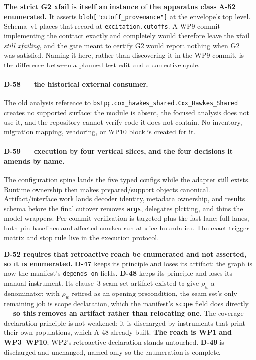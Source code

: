 \documentclass[
  10pt,
]{article}
\begin{document}
\textbf{The strict G2 xfail is itself an instance of the apparatus class A-52
enumerated.} It asserts \texttt{blob["cutoff\_provenance"]} at the envelope's
top level. Schema~v1 places that record at \texttt{excitation.cutoffs}. A WP9
commit implementing the contract exactly and completely would therefore leave
the xfail \emph{still xfailing}, and the gate meant to certify G2 would report
nothing when G2 was satisfied. Naming it here, rather than discovering it in
the WP9 commit, is the difference between a planned test edit and a corrective
cycle.

\paragraph{D-58 --- the historical external consumer.}

The old analysis reference to
\texttt{bstpp.cox\_hawkes\_shared.Cox\_Hawkes\_Shared} creates no supported
surface: the module is absent, the focused analysis does not use it, and the
repository cannot verify code it does not contain. No inventory, migration
mapping, vendoring, or WP10 block is created for it.

\paragraph{D-59 --- execution by four vertical slices, and the four decisions
it amends by name.}

The configuration spine lands the five typed configs while the adapter still
exists. Runtime ownership then makes prepared/support objects canonical.
Artifact/interface work lands decoder identity, metadata ownership, and results
schema before the final cutover removes \texttt{args}, delegates plotting, and
thins the model wrappers. Per-commit verification is targeted plus the fast
lane; full lanes, both pin baselines and affected smokes run at slice
boundaries. The exact trigger matrix and stop rule live in the execution
protocol.

\textbf{D-52 requires that retroactive reach be enumerated and not asserted, so
it is enumerated.} \textbf{D-47} keeps its principle and loses its artifact:
the graph is now the manifest's \texttt{depends\_on} fields. \textbf{D-48}
keeps its principle and loses its manual instrument. Its clause~3 seam-set
artifact existed to give $\rho_w$ a denominator; with $\rho_w$ retired as an
opening precondition, the seam set's only remaining job is scope declaration,
which the manifest's \texttt{scope} field does directly --- \textbf{so this
removes an artifact rather than relocating one}. The coverage-declaration
principle is not weakened: it is discharged by instruments that print their own
populations, which A-48 already built. \textbf{The reach is WP1 and WP3--WP10};
WP2's retroactive declaration stands untouched. \textbf{D-49} is discharged and
unchanged, named only so the enumeration is complete.
\end{document}
